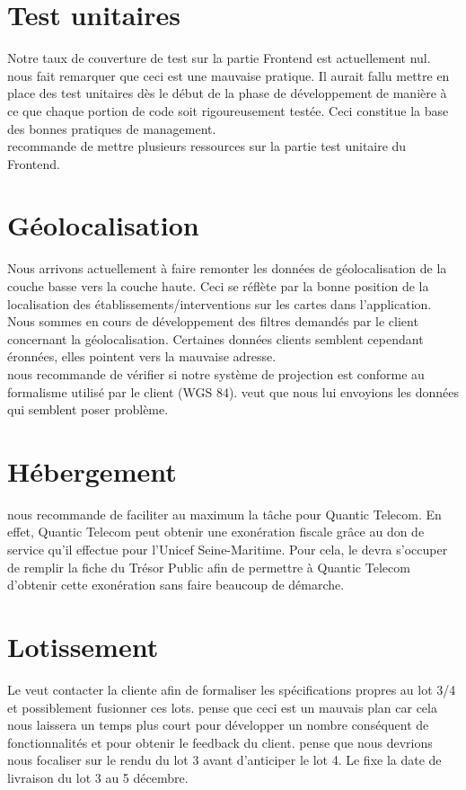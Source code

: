 \documentclass [a4paper] {article}
\begin{document}
\section{Test unitaires}
Notre taux de couverture de test sur la partie Frontend est actuellement nul. \nomTuteurPedago{} nous fait remarquer que ceci est une mauvaise pratique. Il aurait fallu mettre en place des test unitaires dès le début de la phase de développement de manière à ce que chaque portion de code soit rigoureusement testée. Ceci constitue la base des bonnes pratiques de management.\\
\nomTuteurPedago{} recommande de mettre plusieurs ressources sur la partie test unitaire du Frontend.  

\section{Géolocalisation}
Nous arrivons actuellement à faire remonter les données de géolocalisation de la couche basse vers la couche haute. Ceci se réflète par la bonne position de la localisation des établissements/interventions sur les cartes dans l'application. Nous sommes en cours de développement des filtres demandés par le client concernant la géolocalisation. Certaines données clients semblent cependant éronnées, elles pointent vers la mauvaise adresse.\\
\nomTuteurPedago{} nous recommande de vérifier si notre système de projection est conforme au formalisme utilisé par le client (WGS 84). 
\nomTuteurPedago{} veut que nous lui envoyions les données qui semblent poser problème.

\section{Hébergement}
\nomTuteurPedago{} nous recommande de faciliter au maximum la tâche pour Quantic Telecom. En effet, Quantic Telecom peut obtenir une exonération fiscale grâce au don de service qu'il effectue pour l'Unicef Seine-Maritime. Pour cela, le \CP{} devra s'occuper de remplir la fiche du Trésor Public afin de permettre à Quantic Telecom d'obtenir cette exonération sans faire beaucoup de démarche. 

\section{Lotissement}
Le \CP{} veut contacter la cliente afin de formaliser les spécifications propres au lot 3/4 et possiblement fusionner ces lots. \nomTuteurPedago{} pense que ceci est un mauvais plan car cela nous laissera un temps plus court pour développer un nombre conséquent de fonctionnalités et pour obtenir le feedback du client.
\nomTuteurPedago{} pense que nous devrions nous focaliser sur le rendu du lot 3 avant d'anticiper le lot 4.
Le \CP{}  fixe la date de livraison du lot 3 au 5 décembre.
\end{document}
